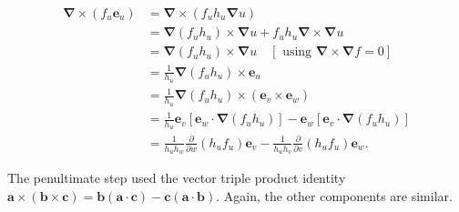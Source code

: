 \begin{formalproof}
\[
\begin{aligned}
\boldsymbol{\nabla} \times\left(f_u \boldsymbol{e}_u\right) & =\boldsymbol{\nabla} \times\left(f_u h_u \boldsymbol{\nabla} u\right) \\
& =\boldsymbol{\nabla}\left(f_u h_u\right) \times \boldsymbol{\nabla} u+f_u h_u \boldsymbol{\nabla} \times \boldsymbol{\nabla} u \\
& =\boldsymbol{\nabla}\left(f_u h_u\right) \times \boldsymbol{\nabla} u \quad[\text { using } \boldsymbol{\nabla} \times \boldsymbol{\nabla} f=0] \\
& =\frac{1}{h_u} \boldsymbol{\nabla}\left(f_u h_u\right) \times \boldsymbol{e}_u \\
& =\frac{1}{h_u} \boldsymbol{\nabla}\left(f_u h_u\right) \times\left(\boldsymbol{e}_v \times \boldsymbol{e}_w\right) \\
& =\frac{1}{h_u} \boldsymbol{e}_v\left[\boldsymbol{e}_w \cdot \boldsymbol{\nabla}\left(f_u h_u\right)\right]-\boldsymbol{e}_w\left[\boldsymbol{e}_v \cdot \boldsymbol{\nabla}\left(f_u h_u\right)\right] \\
& =\frac{1}{h_u h_w} \frac{\partial}{\partial w}\left(h_u f_u\right) \boldsymbol{e}_v-\frac{1}{h_u h_v} \frac{\partial}{\partial v}\left(h_u f_u\right) \boldsymbol{e}_w .
\end{aligned}
\]

The penultimate step used the vector triple product identity \(\boldsymbol{a} \times(\boldsymbol{b} \times \boldsymbol{c})=\boldsymbol{b}(\boldsymbol{a} \cdot \boldsymbol{c})-\boldsymbol{c}(\boldsymbol{a} \cdot \boldsymbol{b})\). Again, the other components are similar.

  
\end{formalproof}
